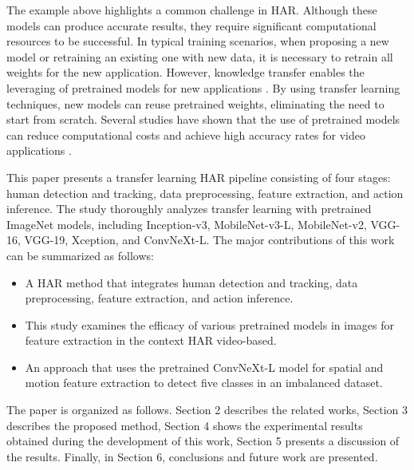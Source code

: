 \documentclass[mathematics,article,submit,pdftex,moreauthors]{Definitions/mdpi}
\begin{document}
The example above highlights a common challenge in HAR. Although these models can produce accurate results, they require significant computational resources to be successful. In typical training scenarios, when proposing a new model or retraining an existing one with new data, it is necessary to retrain all weights for the new application. However, knowledge transfer enables the leveraging of pretrained models for new applications \cite{Tammina_2019}. By using transfer learning techniques, new models can reuse pretrained weights, eliminating the need to start from scratch. Several studies have shown that the use of pretrained models can reduce computational costs and achieve high accuracy rates for video applications \cite{8659002}.

This paper presents a transfer learning HAR pipeline consisting of four stages: human detection and tracking, data preprocessing, feature extraction, and action inference. The study thoroughly analyzes transfer learning with pretrained ImageNet models, including Inception-v3, MobileNet-v3-L, MobileNet-v2, VGG-16, VGG-19, Xception, and ConvNeXt-L. The major contributions of this work can be summarized as follows:

\begin{itemize}
    \item A HAR method that integrates human detection and tracking, data preprocessing, feature extraction, and action inference.
    \item This study examines the efficacy of various pretrained models in images for feature extraction in the context HAR video-based.
    \item An approach that uses the pretrained ConvNeXt-L model for spatial and motion feature extraction to detect five classes in an imbalanced dataset.
\end{itemize}

The paper is organized as follows. Section 2 describes the related works, Section 3 describes the proposed method, Section 4 shows the experimental results obtained during the development of this work, Section 5 presents a discussion of the results. Finally, in Section 6, conclusions and future work are presented.



\end{document}
